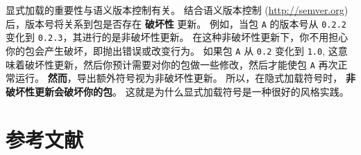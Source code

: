 \documentclass[
  notoc %
]{tufte-book}
\newcommand{\passthrough}[1]{#1}
\begin{document}
显式加载的重要性与语义版本控制有关。 结合语义版本控制
(\url{http://semver.org}) 后，版本号将关系到包是否存在 \textbf{破坏性}
更新。 例如，当包 \passthrough{\lstinline!A!} 的版本号从
\passthrough{\lstinline!0.2.2!} 变化到
\passthrough{\lstinline!0.2.3!}，其进行的是非破坏性更新。
在这种非破坏性更新下，你不用担心你的包会产生破坏，即抛出错误或改变行为。
如果包 \passthrough{\lstinline!A!} 从 \passthrough{\lstinline!0.2!}
变化到 \passthrough{\lstinline!1.0!},
这意味着破坏性更新，然后你预计需要对你的包做一些修改，然后才能使包
\passthrough{\lstinline!A!} 再次正常运行。
\textbf{然而}，导出额外符号视为非破坏性更新。 所以，在隐式加载符号时，
\textbf{非破坏性更新会破坏你的包}。
这就是为什么显式加载符号是一种很好的风格实践。

\hypertarget{sec:references}{%
\chapter*{参考文献}\label{sec:references}}
\end{document}
